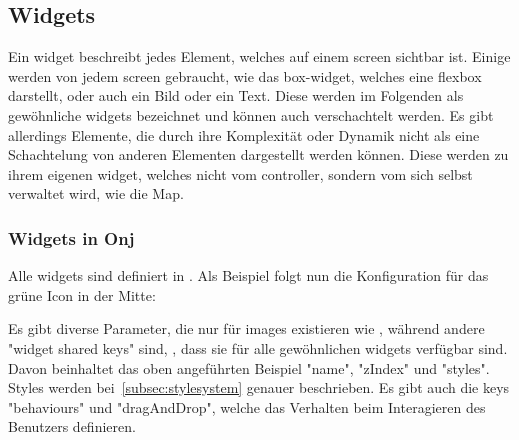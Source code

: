 
\renewcommand{\kapitelautor}{Autor: Felix Zwickelstorfer}
\subsection{Widgets}\label{sec:widgets}
\renewcommand{\kapitelautor}{Autor: Felix Zwickelstorfer}
Ein widget beschreibt jedes Element, welches auf einem screen sichtbar ist. 
Einige werden von jedem screen gebraucht, wie \zB das box-widget, welches eine flexbox darstellt, oder auch ein Bild oder ein Text.
Diese werden im Folgenden als gewöhnliche widgets bezeichnet und können auch verschachtelt werden.
Es gibt allerdings Elemente, die durch ihre Komplexität oder Dynamik nicht als eine Schachtelung von anderen Elementen dargestellt werden können. 
Diese werden zu ihrem eigenen widget, welches nicht vom controller, sondern vom sich selbst verwaltet wird, wie \zB die Map.
\renewcommand{\kapitelautor}{Autor: Felix Zwickelstorfer}
\subsubsection{Widgets in Onj}\label{subsubsec:widgetsinonj}
\renewcommand{\kapitelautor}{Autor: Felix Zwickelstorfer}

Alle widgets sind definiert in .
Als Beispiel folgt nun die Konfiguration für das grüne Icon in der Mitte:
Es gibt diverse Parameter, die nur für images existieren wie \zB {}, während andere "widget shared keys" sind, \dah, dass sie für alle gewöhnlichen widgets verfügbar sind.
Davon beinhaltet das oben angeführten Beispiel "name", "zIndex" und "styles".
Styles werden bei~\ref{subsec:stylesystem} genauer beschrieben.
Es gibt auch die keys "behaviours" und "dragAndDrop", welche das Verhalten beim Interagieren des Benutzers definieren.

